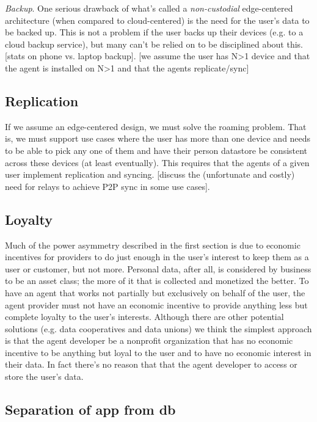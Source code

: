 \documentclass[11pt, oneside]{article}   	%
\begin{document}
\emph{Backup}. One serious drawback of what's called a \emph{non-custodial} edge-centered architecture (when compared to cloud-centered) is the need for the user's data to be backed up. This is not a problem if the user backs up their devices (e.g. to a cloud backup service), but many can't be relied on to be disciplined about this. [stats on phone vs. laptop backup]. [we assume the user has N>1 device and that the agent is installed on N>1 and that the agents replicate/sync]

\subsection{Replication}

If we assume an edge-centered design, we must solve the roaming problem. That is, we must support use cases where the user has more than one device and needs to be able to pick any one of them and have their person datastore be consistent across these devices (at least eventually). This requires that the agents of a given user implement replication and syncing. [discuss the (unfortunate and costly) need for relays to achieve P2P sync in some use cases].

\subsection{Loyalty}

Much of the power asymmetry described in the first section is due to economic incentives for providers to do just enough in the user's interest to keep them as a user or customer, but not more. Personal data, after all, is considered by business to be an asset class; the more of it that is collected and monetized the better. To have an agent that works not partially but exclusively on behalf of the user, the agent provider must not have an economic incentive to provide anything less but complete loyalty to the user's interests. Although there are other potential solutions (e.g. data cooperatives and data unions) we think the simplest approach is that the agent developer be a nonprofit organization that has no economic incentive to be anything but loyal to the user and to have no economic interest in their data. In fact there's no reason that that the agent developer to access or store the user's data.

\subsection{Separation of app from db}
\end{document}
